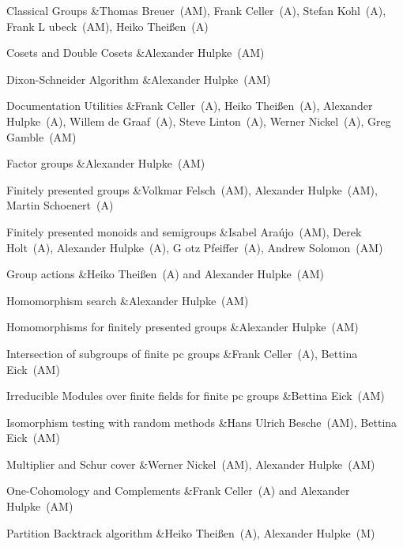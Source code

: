 \item{} Classical Groups 
&Thomas Breuer~(AM), Frank Celler~(A), Stefan Kohl~(A), Frank L{ u}beck~(AM), Heiko Thei{\ss}en~(A)

\item{} Cosets and Double Cosets 
&Alexander Hulpke~(AM)

\item{} Dixon-Schneider Algorithm 
&Alexander Hulpke~(AM)

\item{} Documentation Utilities 
&Frank Celler~(A), Heiko Thei{\ss}en~(A), Alexander Hulpke~(A), Willem de Graaf~(A), Steve Linton~(A), Werner Nickel~(A), Greg Gamble~(AM)

\item{} Factor groups 
&Alexander Hulpke~(AM)

\item{} Finitely presented groups 
&Volkmar Felsch~(AM), Alexander Hulpke~(AM), Martin Schoenert~(A)

\item{} Finitely presented monoids and semigroups 
&Isabel Ara{\'u}jo~(AM), Derek Holt~(A), Alexander Hulpke~(A), G{ o}tz Pfeiffer~(A), Andrew Solomon~(AM)

\item{} Group actions 
&Heiko Thei{\ss}en~(A) and Alexander Hulpke~(AM)

\item{} Homomorphism search 
&Alexander Hulpke~(AM)

\item{} Homomorphisms for finitely presented groups 
&Alexander Hulpke~(AM)

\item{} Intersection of subgroups of finite pc groups 
&Frank Celler~(A), Bettina Eick~(AM)

\item{} Irreducible Modules over finite fields for finite pc groups 
&Bettina Eick~(AM)

\item{} Isomorphism testing with random methods 
&Hans Ulrich Besche~(AM), Bettina Eick~(AM)

\item{} Multiplier and Schur cover 
&Werner Nickel~(AM), Alexander Hulpke~(AM)

\item{} One-Cohomology and Complements 
&Frank Celler~(A) and Alexander Hulpke~(AM)

\item{} Partition Backtrack algorithm 
&Heiko Thei{\ss}en~(A), Alexander Hulpke~(M)

